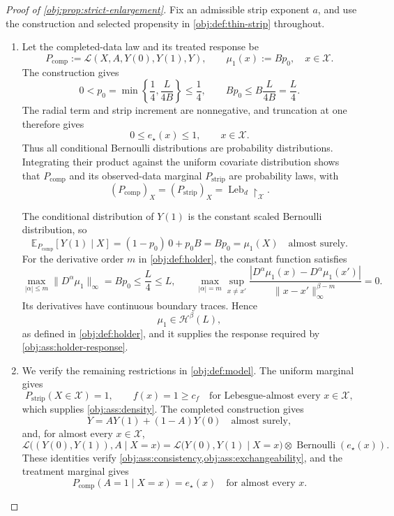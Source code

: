 \documentclass[11pt]{article}
\begin{document}
\begin{proof}[Proof of \cref{obj:prop:strict-enlargement}]
Fix an admissible strip exponent \(a\), and use the construction and selected propensity in \cref{obj:def:thin-strip} throughout.

\begin{enumerate}
\item Let the completed-data law and its treated response be
\[
P_{\mathrm{comp}}
:=
\mathcal L(X,A,Y(0),Y(1),Y),
\qquad
\mu_1(x):=Bp_0,\quad x\in\mathcal X.
\]
The construction gives
\[
0<p_0=\min\left\{\frac14,\frac{L}{4B}\right\}\le\frac14,
\qquad
Bp_0\le B\frac{L}{4B}=\frac L4.
\]
The radial term and strip increment are nonnegative, and truncation at one therefore gives
\[
0\le e_\star(x)\le1,\qquad x\in\mathcal X.
\]
Thus all conditional Bernoulli distributions are probability distributions. Integrating their product against the uniform covariate distribution shows that \(P_{\mathrm{comp}}\) and its observed-data marginal \(P_{\mathrm{strip}}\) are probability laws, with
\[
(P_{\mathrm{comp}})_X=(P_{\mathrm{strip}})_X
=\operatorname{Leb}_d\!\restriction_{\mathcal X}.
\]

The conditional distribution of \(Y(1)\) is the constant scaled Bernoulli distribution, so
\[
\mathbb E_{P_{\mathrm{comp}}}[Y(1)\mid X]
=(1-p_0)\,0+p_0B
=Bp_0
=\mu_1(X)
\quad\text{almost surely}.
\]
For the derivative order \(m\) in \cref{obj:def:holder}, the constant function satisfies
\[
\max_{|\alpha|\le m}\|D^\alpha\mu_1\|_\infty
=Bp_0\le\frac L4\le L,
\qquad
\max_{|\alpha|=m}\sup_{x\ne x'}
\frac{|D^\alpha\mu_1(x)-D^\alpha\mu_1(x')|}
{\|x-x'\|_\infty^{\beta-m}}
=0.
\]
Its derivatives have continuous boundary traces. Hence
\[
\mu_1\in\mathcal H^\beta(L),
\]
as defined in \cref{obj:def:holder}, and it supplies the response required by \cref{obj:ass:holder-response}.

\item We verify the remaining restrictions in \cref{obj:def:model}. The uniform marginal gives
\[
P_{\mathrm{strip}}(X\in\mathcal X)=1,
\qquad
f(x)=1\ge c_f
\quad\text{for Lebesgue-almost every }x\in\mathcal X,
\]
which supplies \cref{obj:ass:density}. The completed construction gives
\[
Y=AY(1)+(1-A)Y(0)
\quad\text{almost surely},
\]
and, for almost every \(x\in\mathcal X\),
\[
\mathcal L\bigl((Y(0),Y(1)),A\mid X=x\bigr)
=
\mathcal L\bigl(Y(0),Y(1)\mid X=x\bigr)
\otimes\operatorname{Bernoulli}(e_\star(x)).
\]
These identities verify \cref{obj:ass:consistency,obj:ass:exchangeability}, and the treatment marginal gives
\[
P_{\mathrm{comp}}(A=1\mid X=x)=e_\star(x)
\quad\text{for almost every }x.
\]


\end{enumerate}
\end{proof}
\end{document}
